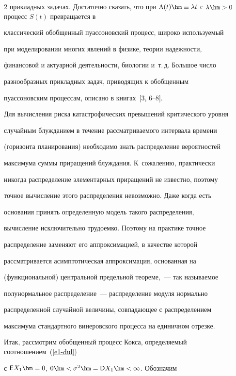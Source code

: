 \begin{multicols}{2}
прикладных задачах. Достаточно сказать, что при $\Lambda(t) \hm\equiv


\lambda t$ с $\lambda \hm> 0$ процесс $S(t)$ превращается в


классический обобщенный пуассоновский процесс, широко используемый


при моделировании многих явлений в физике, теории надежности,


финансовой и актуарной деятельности, биологии и~т.\,д. Большое число


разнообразных прикладных задач, приводящих к обобщенным


пуассоновским процессам, описано в книгах~[3, 6--8].





Для вычисления риска катастрофических превышений критического уровня


случайным блуж\-да\-ни\-ем в течение рассматриваемого интервала времени


(горизонта планирования) необходимо знать распределение вероятностей


максимума суммы приращений блуждания. К~сожалению, практически


никогда распределение элементарных приращений не известно, поэтому


точное вычисление этого распределения невозможно. Даже когда есть


основания принять определенную модель такого распределения,


вычисление исключительно трудоемко. Поэтому на практике точное


распределение заменяют его аппроксимацией, в качестве которой


рассматривается асимптотическая аппроксимация, основанная на


(функциональной) центральной предельной теореме,~--- так на\-зы\-ва\-емое


полунормальное распределение~--- распределение модуля нормально


распределенной случайной величины, совпадающее с распределением


максимума стандартного винеровского процесса на единичном отрезке.





Итак, рассмотрим обобщенный процесс Кокса, определяемый соотношением~(\ref{e1-dul}) 


с ${\sf E}X_1\hm=0$, $0\hm<\sigma^2\hm={\sf D}X_1\hm<\infty$. Обозначим



\end{multicols}

